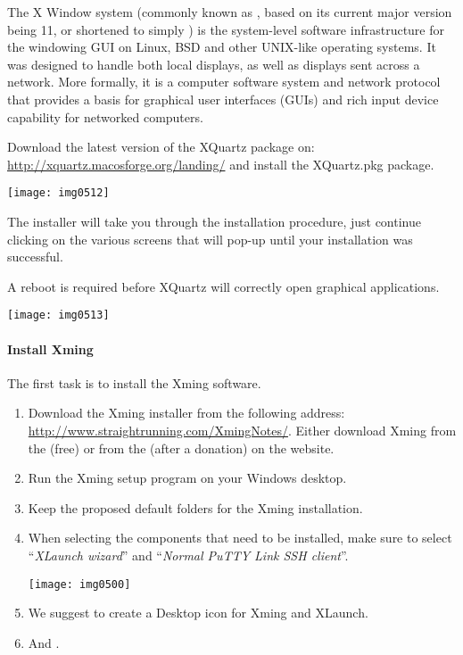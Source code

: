 The X Window system (commonly known as , based on its current major
version being 11, or shortened to simply ) is the system-level
software infrastructure for the windowing GUI on Linux, BSD and other UNIX-like
operating systems. It was designed to handle both local displays, as well as
displays sent across a network. More formally, it is a computer software system
and network protocol that provides a basis for graphical user interfaces (GUIs)
and rich input device capability for networked computers.

\ifmac
  Download the latest version of the XQuartz package on:
  \url{http://xquartz.macosforge.org/landing/}
  and install the XQuartz.pkg package.

  \begin{center}
  \texttt{[image: img0512]}
  \end{center}

  The installer will take you through the installation procedure, just continue
  clicking  on the various screens that will pop-up until your
  installation was successful.

  A reboot is required before XQuartz will correctly open graphical applications.

  \begin{center}
  \texttt{[image: img0513]}
  \end{center}
\fi

\ifwindows
  \paragraph{Install Xming}

  The first task is to install the Xming software.

  \begin{enumerate}
    \item  Download the Xming installer from the following
      address: \url{http://www.straightrunning.com/XmingNotes/}. Either download Xming
      from the  (free) or from the  (after a donation) on the website.
    \item  Run the Xming setup program on your Windows desktop.
    \item  Keep the proposed default folders for the Xming installation.
    \item  When selecting the components that need to be installed, make sure to
      select ``\emph{XLaunch wizard}'' and ``\emph{Normal PuTTY Link SSH client}''.

  \begin{center}
  \texttt{[image: img0500]}
  \end{center}

  \item  We suggest to create a Desktop icon for Xming and XLaunch.
  \item  And .
  \end{enumerate}

